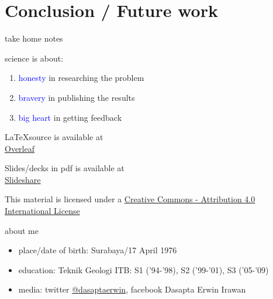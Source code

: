 \documentclass[10pt]{beamer}
\begin{document}
\section{Conclusion / Future work}

\begin{frame}{take home notes}

\begin{center}science is about:\end{center}

\begin{center}
\begin{enumerate}
	\item \textcolor{blue}{honesty} in researching the problem
	\item \textcolor{blue}{bravery} in publishing the results 
    \item \textcolor{blue}{big heart} in getting feedback 
\end{enumerate}
\end{center}

\end{frame}

\begin{frame}[standout]

\begin{center}
\LaTeX  source is available at \\
\href{www.overleaf.com/5507974mcbqsc}{Overleaf}
\end{center}

\begin{center}
Slides/decks in pdf is available at \\
\href{www.slideshare.net/d_erwin_irawan}{Slideshare}
\end{center}

\end{frame}

\begin{frame}[standout]
\begin{center}This material is licensed under a \href{http://creativecommons.org/licenses/by-sa/4.0/}{Creative Commons - Attribution 4.0 International License}\end{center}
\begin{center}\ccby\end{center}
\end{frame}

\begin{frame}{about me}
  \begin{itemize}
	\item place/date of birth: Surabaya/17 April 1976
    \item education: Teknik Geologi ITB: S1 ('94-'98), S2 ('99-'01), S3 ('05-'09)
    \item media: twitter \href{www.twitter.com/dasaptaerwin}{@dasaptaerwin}, facebook Dasapta Erwin Irawan
  \end{itemize}
\end{frame}
\end{document}
